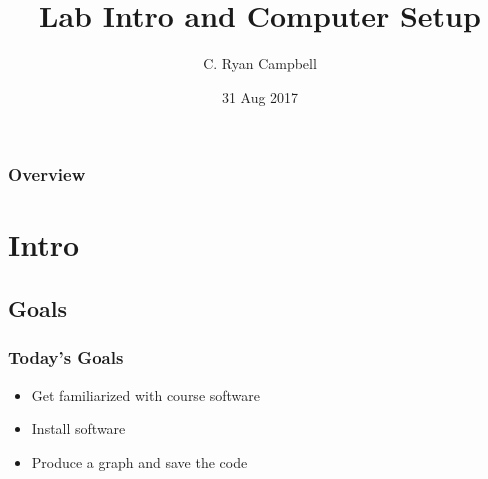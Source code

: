 \documentclass[14pt]{beamer}
\title[Lab Intro]{Lab Intro and Computer Setup} %
\author{C. Ryan Campbell} %
\institute[Duke] %
{
Duke University \\ %
\medskip
\textit{c.ryan.campbell@duke.edu} %
}
\date{31 Aug 2017} %
\begin{document}
\begin{frame}
\titlepage %
\end{frame}

\begin{frame}
\frametitle{Overview} %
\tableofcontents %
\end{frame}


\section{Intro} %

\subsection{Goals} %

\begin{frame}
\frametitle{Today's Goals}
\begin{itemize}
	\item Get familiarized with course software
	\item Install software
	\item Produce a graph and save the code
\end{itemize}
\end{frame}
\end{document}
